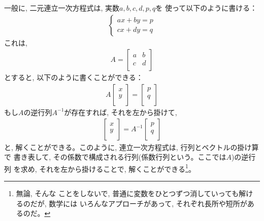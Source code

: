 一般に, 二元連立一次方程式は, 実数$a, b, c, d, p, q$を
使って以下のように書ける：
\begin{eqnarray}\begin{cases}
ax+by=p\\
cx+dy=q
\end{cases}\end{eqnarray}
これは, 
\begin{eqnarray}
A=\begin{bmatrix}
a & b \\
c & d \\
\end{bmatrix}
\end{eqnarray}
とすると, 以下のように書くことができる：
\begin{eqnarray}
A\begin{bmatrix}
x \\
y \\
\end{bmatrix}
=\begin{bmatrix}
p \\
q \\
\end{bmatrix}
\end{eqnarray}
もし$A$の逆行列$A^{-1}$が存在すれば, それを左から掛けて, 
\begin{eqnarray}
\begin{bmatrix}
x \\
y \\
\end{bmatrix}
=A^{-1}\begin{bmatrix}
p \\
q \\
\end{bmatrix}
\end{eqnarray}
と, 解くことができる。このように, 連立一次方程式は, 行列とベクトルの掛け算で
書き表して, その係数で構成される行列(係数行列という。ここでは$A$)の逆行列
を求め, それを左から掛けることで, 解くことができる\footnote{無論, そんな
ことをしないで, 普通に変数をひとつずつ消していっても解けるのだが, 数学には
いろんなアプローチがあって, それぞれ長所や短所があるのだ。}。


